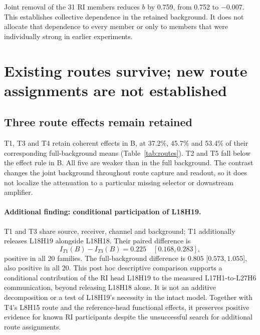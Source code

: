 \documentclass[11pt,a4paper]{article}
\begin{document}
Joint removal of the 31 RI members reduces $b$ by 0.759, from 0.752 to $-0.007$.
This establishes collective dependence in the retained background. It does not
allocate that dependence to every member or only to members that were individually
strong in earlier experiments.

\section{Existing routes survive; new route assignments are not established}
\subsection{Three route effects remain retained}
T1, T3 and T4 retain coherent effects in B, at 37.2\%, 45.7\% and 53.4\% of
their corresponding full-background means (Table~\ref{tab:routes}). T2 and T5
fall below the effect rule in B. All five are weaker than in the full background.
The contrast changes the joint background throughout route capture and readout,
so it does not localize the attenuation to a particular missing selector or
downstream amplifier.

\begin{table}[htbp]\centering\scriptsize
\setlength{\tabcolsep}{3.5pt}

\caption{Route noising effects on the same 40 pairs. Ratio compares the signed
mean in B to the signed full-background mean. Effects are stronger in order 0 for
the retained routes, but remain positive in order 1.}
\label{tab:routes}
\end{table}

\paragraph{Additional finding: conditional participation of L18H19.}
T1 and T3 share source, receiver, channel and background; T1 additionally releases
L18H19 alongside L18H18. Their paired difference is
\[
 I_{T1}(B)-I_{T3}(B)=0.225\quad[0.168,0.283],
\]
positive in all 20 families. The full-background difference is
$0.805$ [$0.573,1.055$], also positive in all 20. This post hoc descriptive
comparison supports a conditional contribution of the RI head L18H19 to the
measured L17H1-to-L27H6 communication, beyond releasing L18H18 alone. It is not
an additive decomposition or a test of L18H19's necessity in the intact model.
Together with T4's L8H15 route and the reference-head functional effects, it
preserves positive evidence for known RI participants despite the unsuccessful
search for additional route assignments.
\end{document}
